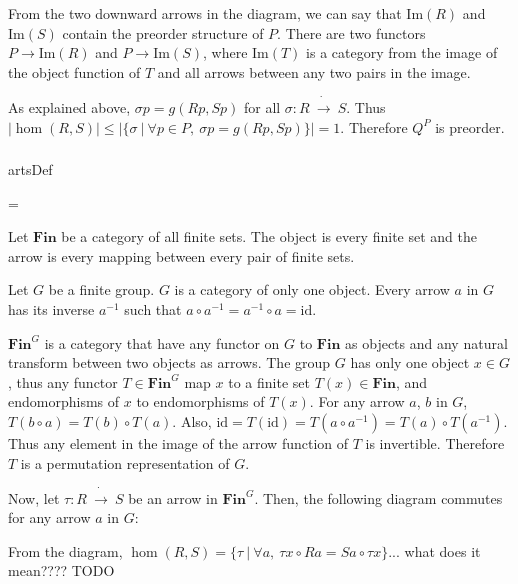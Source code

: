 \documentclass{article}
\newcounter{artCounter}
\newcounter{maxArts}
\newcommand{\showArt}{
\csname artsDef\roman{artCounter}\endcsname
\addtocounter{artCounter}{1}
\ifnum \value{artCounter}=\value{maxArts}
\setcounter{artCounter}{0}
\fi
}
\begin{document}
\begin{center}
\end{center}

From the two downward arrows in the diagram, we can say that $\mathrm{Im}(R)$ and $\mathrm{Im}(S)$ contain the preorder structure of $P$. There are two functors $P \rightarrow \mathrm{Im}(R)$ and $P \rightarrow \mathrm{Im}(S)$, where $\mathrm{Im}(T)$ is a category from the image of the object function of $T$ and all arrows between any two pairs in the image.

As explained above, $\sigma p = g(Rp, Sp)$ for all $\sigma : R\ \dot{\rightarrow}\ S$. Thus $|\hom(R, S)| \leq |\{\sigma\ |\ \forall p \in P,\ \sigma p = g(Rp, Sp)\}| = 1$. Therefore $Q^P$ is preorder.

\subsubsection{}



\showArt

Let $\mathbf{Fin}$ be a category of all finite sets. The object is every finite set and the arrow is every mapping between every pair of finite sets.

Let $G$ be a finite group. $G$ is a category of only one object. Every arrow $a$ in $G$ has its inverse $a^{-1}$ such that $a \circ a^{-1} = a^{-1} \circ a = \mathrm{id}$.

$\mathbf{Fin}^G$ is a category that have any functor on $G$ to $\mathbf{Fin}$ as objects and any natural transform between two objects as arrows. The group $G$ has only one object $x \in G$, thus any functor $T \in \mathbf{Fin}^G$ map $x$ to a finite set $T(x) \in \mathbf{Fin}$, and endomorphisms of $x$ to endomorphisms of $T(x)$. For any arrow $a$, $b$ in $G$, $T(b \circ a) = T(b) \circ T(a)$. Also, $\mathrm{id} = T(\mathrm{id}) = T(a \circ a^{-1}) = T(a) \circ T(a^{-1})$. Thus any element in the image of the arrow function of $T$ is invertible. Therefore $T$ is a permutation representation of $G$.

Now, let $\tau : R\ \dot{\rightarrow}\ S$ be an arrow in $\mathbf{Fin}^G$. Then, the following diagram commutes for any arrow $a$ in $G$:
\begin{center}
\end{center}
From the diagram, $\hom(R, S) = \{\tau\ |\ \forall a,\ \tau x \circ R a = S a \circ \tau x\}$... what does it mean???? TODO
\end{document}
